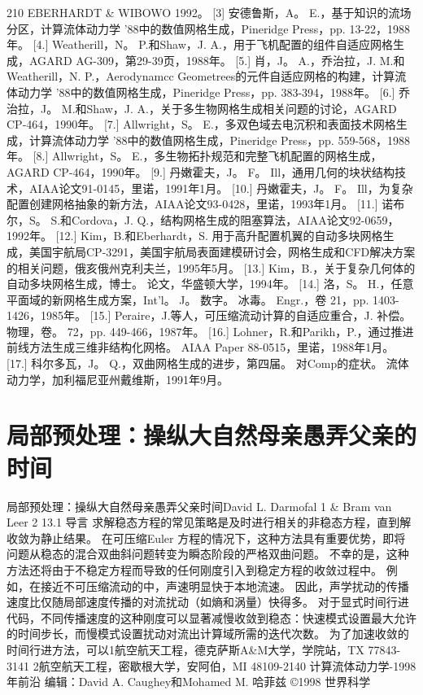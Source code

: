 \documentclass[UTF8,11pt,a4paper,openany,fontset=fandol]{ctexbook}
\begin{document}
210 EBERHARDT \& WIBOWO 1992。 [3] 安德鲁斯，A。 E.，基于知识的流场分区，计算流体动力学 '88中的数值网格生成，Pineridge Press，pp. 13-22，1988年。 [4.] Weatherill，N。 P.和Shaw，J. A.，用于飞机配置的组件自适应网格生成，AGARD AG-309，第29-39页，1988年。 [5.] 肖，J。 A.，乔治拉，J. M.和Weatherill，N. P.，Aerodynamcc Geometrees的元件自适应网格的构建，计算流体动力学 '88中的数值网格生成，Pineridge Press，pp. 383-394，1988年。 [6.] 乔治拉，J。 M.和Shaw，J. A.，关于多生物网格生成相关问题的讨论，AGARD CP-464，1990年。 [7.] Allwright，S。 E.，多双色域去电沉积和表面技术网格生成，计算流体动力学 '88中的数值网格生成，Pineridge Press，pp. 559-568，1988年。 [8.] Allwright，S。 E.，多生物拓扑规范和完整飞机配置的网格生成，AGARD CP-464，1990年。 [9.] 丹嫩霍夫，J。 F。 Ill，通用几何的块状结构技术，AIAA论文91-0145，里诺，1991年1月。 [10.] 丹嫩霍夫，J。 F。 Ill，为复杂配置创建网格抽象的新方法，AIAA论文93-0428，里诺，1993年1月。 [11.] 诺布尔，S。 S.和Cordova，J. Q.，结构网格生成的阻塞算法，AIAA论文92-0659，1992年。 [12.] Kim，B.和Eberhardt，S. 用于高升配置机翼的自动多块网格生成，美国宇航局CP-3291，美国宇航局表面建模研讨会，网格生成和CFD解决方案的相关问题，俄亥俄州克利夫兰，1995年5月。 [13.] Kim，B.，关于复杂几何体的自动多块网格生成，博士。 论文，华盛顿大学，1994年。 [14.] 洛，S。 H.，任意平面域的新网格生成方案，Int'l。 J。 数字。 冰毒。 Engr.，卷 21，pp. 1403-1426，1985年。 [15.] Peraire，J.等人，可压缩流动计算的自适应重合，J. 补偿。 物理，卷。 72，pp. 449-466，1987年。 [16.] Lohner，R.和Parikh，P.，通过推进前线方法生成三维非结构化网格。 AIAA Paper 88-0515，里诺，1988年1月。 [17.] 科尔多瓦，J。 Q.，双曲网格生成的进步，第四届。 对Comp的症状。 流体动力学，加利福尼亚州戴维斯，1991年9月。

\clearpage
\chapter{局部预处理：操纵大自然母亲愚弄父亲的时间}
局部预处理：操纵大自然母亲愚弄父亲时间David L. Darmofal 1 \& Bram van Leer 2 13.1 导言 求解稳态方程的常见策略是及时进行相关的非稳态方程，直到解收敛为静止结果。 在可压缩Euler 方程的情况下，这种方法具有重要优势，即将问题从稳态的混合双曲斜问题转变为瞬态阶段的严格双曲问题。 不幸的是，这种方法还将由于不稳定方程而导致的任何刚度引入到稳定方程的收敛过程中。 例如，在接近不可压缩流动的中，声速明显快于本地流速。 因此，声学扰动的传播速度比仅随局部速度传播的对流扰动（如熵和涡量）快得多。 对于显式时间行进代码，不同传播速度的这种刚度可以显著减慢收敛到稳态：快速模式设置最大允许的时间步长，而慢模式设置扰动对流出计算域所需的迭代次数。 为了加速收敛的时间行进方法，可以1航空航天工程，德克萨斯A\&M大学，学院站，TX 77843-3141 2航空航天工程，密歇根大学，安阿伯，MI 48109-2140 计算流体动力学-1998年前沿 编辑：David A. Caughey和Mohamed M. 哈菲兹 ©1998 世界科学
\end{document}
